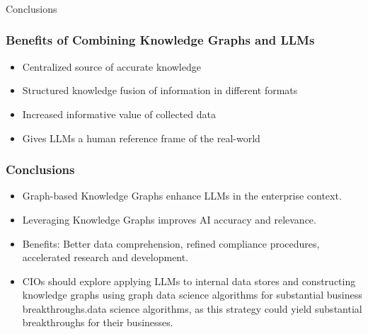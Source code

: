 \begin{frame}[fragile]\frametitle{}
\begin{center}
{\Large Conclusions}

\end{center}
\end{frame}

\begin{frame}[fragile]\frametitle{Benefits of Combining Knowledge Graphs and LLMs}

\begin{itemize}
\item Centralized source of accurate knowledge
\item Structured knowledge fusion of information in different formats
\item Increased informative value of collected data
\item Gives LLMs a human reference frame of the real-world
\end{itemize}

\end{frame}


\begin{frame}[fragile]\frametitle{Conclusions}
\begin{itemize}
\item Graph-based Knowledge Graphs enhance LLMs in the enterprise context.
\item Leveraging Knowledge Graphs improves AI accuracy and relevance.
\item Benefits: Better data comprehension, refined compliance procedures, accelerated research and development.
\item CIOs should explore applying LLMs to internal data stores and constructing knowledge graphs using graph data science algorithms for substantial business breakthroughs.data science algorithms, as this strategy could yield substantial breakthroughs for their businesses.
\end{itemize}
\end{frame}


